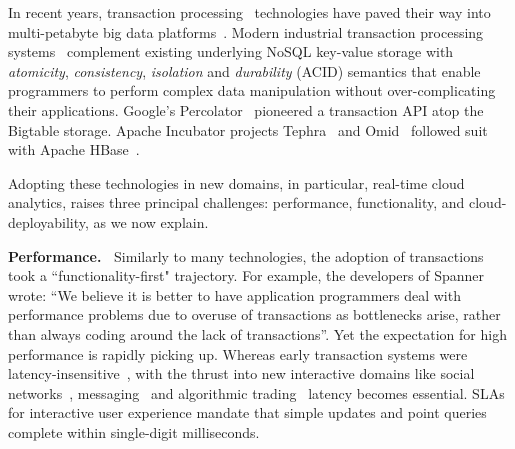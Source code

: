 In recent years, transaction processing~\cite{Gray:1992:TPC:573304} technologies have paved their way into multi-petabyte big data 
platforms~\cite{Percolator2010,Spanner2012,Omid2017}. 
Modern industrial transaction processing systems~\cite{Percolator2010, Omid2017, tephra, cockroach} complement 
existing underlying NoSQL key-value storage with {\em atomicity}, {\em consistency}, {\em isolation\/} and {\em durability} (ACID) 
semantics that enable programmers to perform complex data manipulation without over-complicating their applications. 
Google's Percolator~\cite{Percolator2010} pioneered a transaction API atop the Bigtable storage. Apache 
Incubator projects Tephra~\cite{tephra} and Omid~\cite{Omid2017} followed suit with Apache HBase~\cite{hbase}. 

Adopting these technologies in new domains, in particular, real-time cloud analytics, raises three principal challenges: performance, functionality, and cloud-deployability, as we now explain.   

{\bf Performance.\ }
Similarly to many technologies, the adoption of transactions took a  ``functionality-first" trajectory. 
For example, the developers of Spanner~\cite{Spanner2012} wrote: 
  ``We believe it
is better to have application programmers deal with performance problems due to overuse 
of transactions as bottlenecks arise, rather than always coding around the lack of transactions''. 
Yet the expectation for high performance is rapidly picking up. 
Whereas early transaction systems were  latency-insensitive~\cite{Percolator2010, Omid2017}, 
with the thrust into new interactive domains like social networks~\cite{chatter},  
messaging~\cite{Borthakur:2011} and algorithmic trading~\cite{opentsdb} latency becomes essential.  
SLAs for interactive user experience mandate that simple updates and point queries  complete within single-digit milliseconds. 

